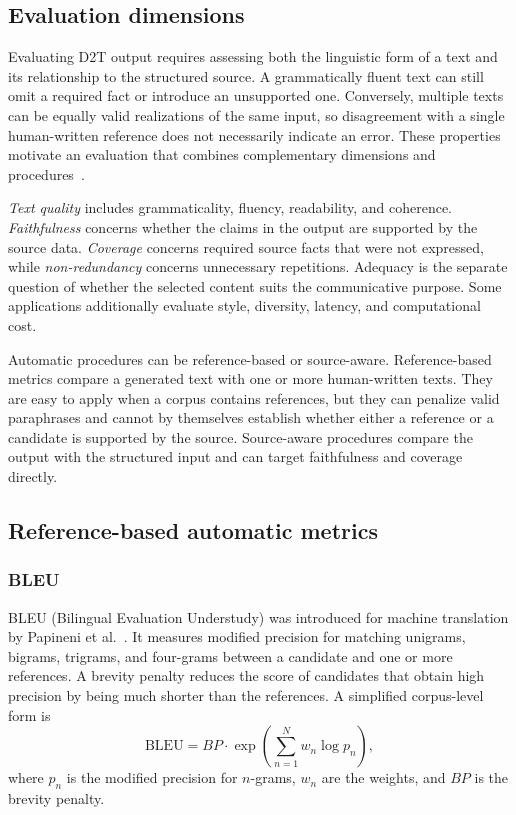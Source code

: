 \subsection{Evaluation dimensions}

Evaluating D2T output requires assessing both the linguistic form of a text and
its relationship to the structured source. A grammatically fluent text can still
omit a required fact or introduce an unsupported one. Conversely, multiple texts
can be equally valid realizations of the same input, so disagreement with a
single human-written reference does not necessarily indicate an error. These
properties motivate an evaluation that combines complementary dimensions and
procedures~\cite{gatt2018survey,novikova-etal-2017-need}.

\emph{Text quality} includes grammaticality, fluency, readability, and
coherence. \emph{Faithfulness} concerns whether the claims in the output are
supported by the source data. \emph{Coverage} concerns required source facts
that were not expressed, while \emph{non-redundancy} concerns unnecessary
repetitions. Adequacy is the separate question of whether the selected content
suits the communicative purpose. Some applications additionally evaluate style,
diversity, latency, and computational cost.

Automatic procedures can be reference-based or source-aware. Reference-based
metrics compare a generated text with one or more human-written texts. They are
easy to apply when a corpus contains references, but they can penalize valid
paraphrases and cannot by themselves establish whether either a reference or a
candidate is supported by the source. Source-aware procedures compare the output
with the structured input and can target faithfulness and coverage directly.

\subsection{Reference-based automatic metrics}

\subsubsection{BLEU}

BLEU (Bilingual Evaluation Understudy) was introduced for machine translation by
Papineni et al.~\cite{papineni2002bleu}. It measures modified precision for matching
unigrams, bigrams, trigrams, and four-grams between a candidate and one or more
references. A brevity penalty reduces the score of candidates that obtain high
precision by being much shorter than the references. A simplified corpus-level
form is
\begin{equation}
    \mathrm{BLEU} = BP \cdot \exp\left(\sum_{n=1}^{N} w_n \log p_n\right),
\end{equation}
where $p_n$ is the modified precision for $n$-grams, $w_n$ are the weights, and
$BP$ is the brevity penalty.

